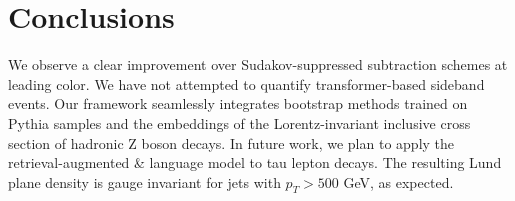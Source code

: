 \section{Conclusions}\label{sec:conclusions}

We observe a clear improvement over Sudakov-suppressed subtraction
schemes at leading color. We have not attempted to quantify
transformer-based sideband events. Our framework seamlessly integrates
bootstrap methods trained on Pythia samples and the embeddings of the
Lorentz-invariant inclusive cross section of hadronic Z boson decays. In
future work, we plan to apply the retrieval-augmented & language model to
tau lepton decays. The resulting Lund plane density is gauge invariant
for jets with $p_T > 500$ GeV, as expected.

